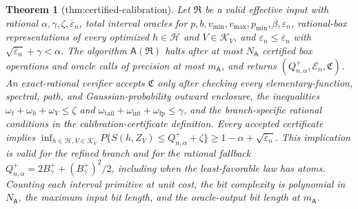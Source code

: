 \documentclass{article}
\newtheorem{theorem}{Theorem}
\begin{document}
\begin{theorem}[thm:certified-calibration]\label{thm:certified-calibration}
Let \(\mathfrak R\) be a valid effective input with rational \(\alpha,\gamma,\zeta,\overline\varepsilon_n\), total interval oracles for \(p,b,v_{\min},v_{\max},p_{\min},\beta,\varepsilon_n\), rational-box representations of every optimized \(h\in\mathcal H\) and \(V\in\mathcal K_V\), and \(\varepsilon_n\le\overline\varepsilon_n\) with \(\sqrt{\overline\varepsilon_n}+\gamma<\alpha\). The algorithm \(\mathsf A(\mathfrak R)\) halts after at most \(N_{\mathsf A}\) certified box operations and oracle calls of precision at most \(m_{\mathsf A}\), and returns \((Q^+_{n,\alpha},\mathcal E_n,\mathfrak C)\). An exact-rational verifier accepts \(\mathfrak C\) only after checking every elementary-function, spectral, path, and Gaussian-probability outward enclosure, the inequalities \(\omega_t+\omega_h+\omega_V\le\zeta\) and \(\omega_{\mathrm{tail}}+\omega_{\mathrm{int}}+\omega_{\mathrm{fp}}\le\gamma\), and the branch-specific rational conditions in the calibration-certificate definition. Every accepted certificate implies \(\inf_{h\in\mathcal H,V\in\mathcal K_V}P\{S(h,Z_V)\le Q^+_{n,\alpha}+\zeta\}\ge1-\alpha+\sqrt{\overline\varepsilon_n}\). This implication is valid for the refined branch and for the rational fallback \(Q^+_{n,\alpha}=2B_\gamma^++(B_\gamma^+)^2/2\), including when the least-favorable law has atoms. Counting each interval primitive at unit cost, the bit complexity is polynomial in \(N_{\mathsf A}\), the maximum input bit length, and the oracle-output bit length at \(m_{\mathsf A}\).
\end{theorem}
\end{document}
